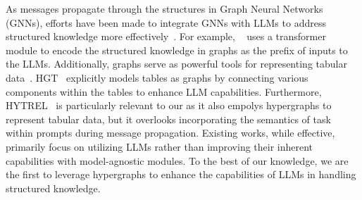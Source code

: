 As messages propagate through the structures in Graph Neural Networks (GNNs), efforts have been made to integrate GNNs with LLMs to address structured knowledge more effectively~\cite{10.1145/3589334.3645627,ren2024survey,chai2023graphllm,tian2024graph,liu2024git}. For example, ~\citet{chai2023graphllm} uses a transformer module to encode the structured knowledge in graphs as the prefix of inputs to the LLMs.
Additionally, graphs serve as powerful tools for representing tabular data~\cite{chen2024hytrel,jin2024hgt}. HGT~\cite{jin2024hgt} explicitly models tables as graphs by connecting various components within the tables to enhance LLM capabilities. %
Furthermore, HYTREL~\cite{chen2024hytrel} is particularly relevant to our \name as it also empolys hypergraphs to represent tabular data, but it overlooks incorporating the semantics of task within prompts during message propagation. Existing works, while effective, primarily focus on utilizing LLMs rather than improving their inherent capabilities with model-agnostic modules. To the best of our knowledge, we are the first to leverage hypergraphs to enhance the capabilities of LLMs in handling structured knowledge.

